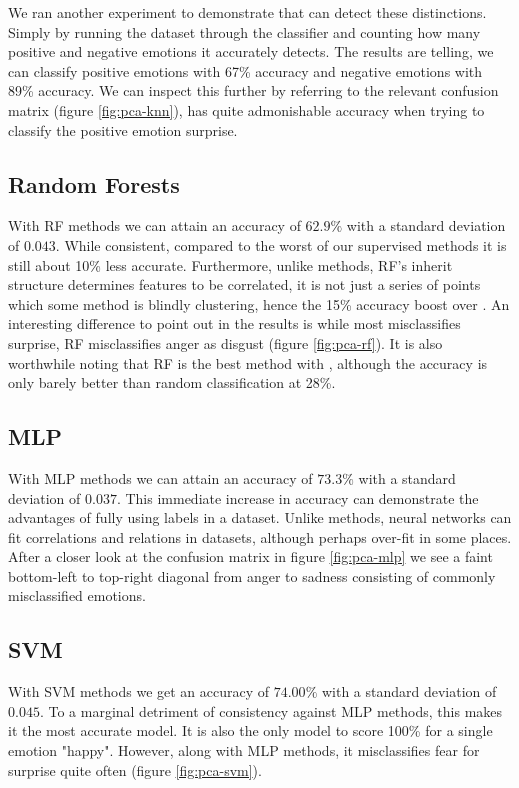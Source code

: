We ran another experiment to demonstrate that \knn can detect these distinctions. Simply by running the dataset through the \knn classifier and counting how many positive and negative emotions it accurately detects. The results are telling, we can classify positive emotions with 67\% accuracy and negative emotions with 89\% accuracy. We can inspect this further by referring to the relevant confusion matrix (figure \ref{fig:pca-knn}), \knn has quite admonishable accuracy when trying to classify the positive emotion surprise.

\subsection{Random Forests}

With RF methods we can attain an accuracy of $62.9\%$ with a standard deviation of $0.043$. While consistent, compared to the worst of our supervised methods it is still about 10\% less accurate. Furthermore, unlike \knn methods, RF's inherit structure determines features to be correlated, it is not just a series of points which some method is blindly clustering, hence the 15\% accuracy boost over \knn. An interesting difference to point out in the results is while \knn most misclassifies surprise, RF misclassifies anger as disgust (figure \ref{fig:pca-rf}). It is also worthwhile noting that RF is the best method with \tsne, although the accuracy is only barely better than random classification at 28\%.

\subsection{MLP}

With MLP methods we can attain an accuracy of $73.3\%$ with a standard deviation of $0.037$. This immediate increase in accuracy can demonstrate the advantages of fully using labels in a dataset. Unlike \knn methods, neural networks can fit correlations and relations in datasets, although perhaps over-fit in some places. After a closer look at the confusion matrix in figure \ref{fig:pca-mlp} we see a faint bottom-left to top-right diagonal from anger to sadness consisting of commonly misclassified emotions.

\subsection{SVM}

With SVM methods we get an accuracy of $74.00\%$ with a standard deviation of $0.045$. To a marginal detriment of consistency against MLP methods, this makes it the most accurate model. It is also the only model to score 100\% for a single emotion "happy". However, along with MLP methods, it misclassifies fear for surprise quite often (figure \ref{fig:pca-svm}).

